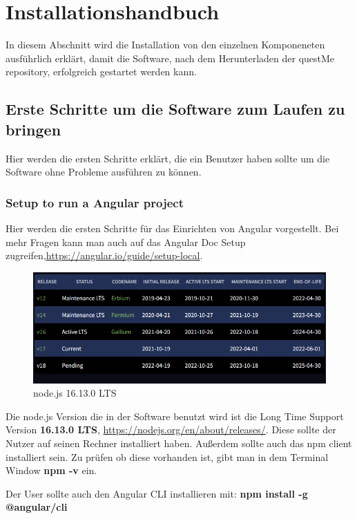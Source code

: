 \section{Installationshandbuch}
In diesem Abschnitt wird die Installation von den einzelnen Komponeneten
ausführlich erklärt, damit die Software, nach dem Herunterladen der questMe repository, erfolgreich gestartet werden kann.

\subsection{Erste Schritte um die Software zum Laufen zu bringen}
Hier werden die ersten Schritte erklärt, die ein Benutzer haben sollte um die
Software ohne Probleme ausführen zu können.

\subsubsection{Setup to run a Angular project}
Hier werden die ersten Schritte für das Einrichten von Angular vorgestellt.
Bei mehr Fragen kann man auch auf das Angular Doc Setup zugreifen,\href{https://angular.io/guide/setup-local}{https://angular.io/guide/setup-local}.
\begin{figure}[H]
    \centering
    \includegraphics[width=1.0\textwidth]{bilder/installationshandbuch/node.js_version_16.13.0_LTS.PNG}
    \caption{node.js 16.13.0 LTS}
    \label{fig:node.js_16.13.0_LTS}
\end{figure}
\noindent Die node.js Version die in der Software benutzt wird ist die Long Time Support Version \textbf{16.13.0 LTS}, \href{https://nodejs.org/en/about/releases/}{https://nodejs.org/en/about/releases/}.
Diese sollte der Nutzer auf seinen Rechner installiert haben.
Außerdem sollte auch das npm client installiert sein. Zu prüfen ob diese vorhanden ist,
gibt man in dem Terminal Window \textbf{npm -v} ein.\newline

\noindent Der User sollte auch den Angular CLI installieren mit: 
\textbf{npm install -g @angular/cli}

